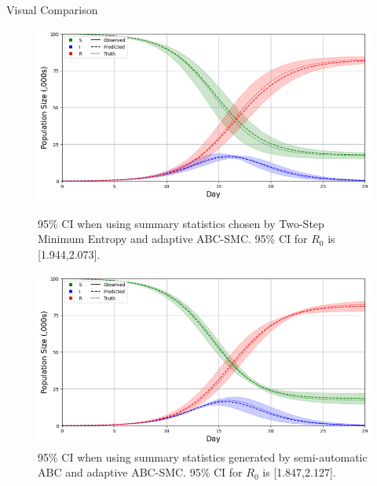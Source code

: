 \documentclass[aspectratio=169]{beamer}
\begin{document}
\begin{frame}{Visual Comparison}
  \begin{figure}[!htb]
    \centering
    \begin{minipage}{.5\textwidth}
        \centering
        \centering\includegraphics[width=1\textwidth]{two_step_ME_ABC_SMC_full_data_CI.png}
        \caption{95\% CI when using summary statistics chosen by Two-Step Minimum Entropy and adaptive ABC-SMC. 95\% CI for $R_0$ is [1.944,2.073].}
    \end{minipage}%
    \begin{minipage}{.5\textwidth}
        \centering\includegraphics[width=1\textwidth]{Semi_Auto_ABC_SMC_full_data_CI.png}
        \caption{95\% CI when using summary statistics generated by semi-automatic ABC and adaptive ABC-SMC. 95\% CI for $R_0$ is [1.847,2.127].}
    \end{minipage}
  \end{figure}
\end{frame}
\end{document}
